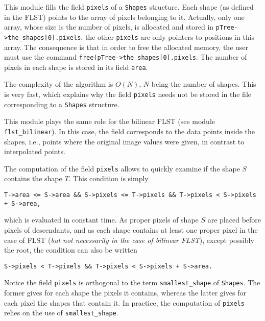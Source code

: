 This module fills the field \verb+pixels+ of a \verb+Shapes+ structure.
Each shape (as defined in the FLST) points to the array of
pixels belonging to it. Actually, only one array, whose size
is the number of pixels, is allocated and stored in
\verb+pTree->the_shapes[0].pixels+, the other \verb+pixels+ are only
pointers to positions in this array.
The consequence is that in order to free the allocated memory, the user must
use the command \verb+free(pTree->the_shapes[0].pixels+.
The number of pixels in each shape is stored in its field \verb+area+.

The complexity of the algorithm is $O(N)$, $N$ being the number of
shapes. This is very fast, which explains why the field \verb+pixels+ needs
not be stored in the file corresponding to a \verb+Shapes+ structure.

This module plays the same role for the bilinear FLST (see module
\verb+flst_bilinear+). In this case, the field corresponds to the data
points inside the shapes, i.e., points where the original image values were
given, in contrast to interpolated points.

The computation of the field \verb+pixels+ allows to quickly examine if the
shape $S$ contains the shape $T$. This condition is simply
\begin{verbatim}
T->area <= S->area && S->pixels <= T->pixels && T->pixels < S->pixels + S->area,
\end{verbatim}
which is evaluated in constant time. As proper pixels of shape
$S$ are placed before pixels of descendants, and as each shape contains at
least one proper pixel in the case of FLST ({\em but not necessarily in the
case of bilinear FLST}), except possibly the root, the condition can also
be written 
\begin{verbatim}
S->pixels < T->pixels && T->pixels < S->pixels + S->area.
\end{verbatim}

Notice the field \verb+pixels+ is orthogonal to the term
\verb+smallest_shape+ of \verb+Shapes+. The former gives for each shape
the pixels it contains, whereas the latter gives for each pixel the shapes
that contain it. In practice, the computation of \verb+pixels+ relies on the
use of \verb+smallest_shape+.

